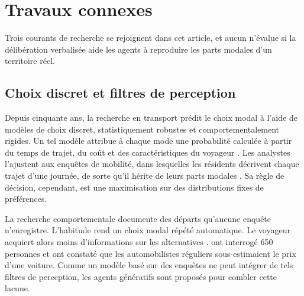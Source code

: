 
\section{Travaux connexes}
\label{sec:related}

Trois courants de recherche se rejoignent dans cet article, et aucun n'évalue si la délibération verbalisée aide les agents à reproduire les parts modales d'un territoire réel.

\subsection{Choix discret et filtres de perception}
\label{sec:discrete-choice}

Depuis cinquante ans, la recherche en transport prédit le choix modal à l'aide de modèles de choix discret, statistiquement robustes et comportementalement rigides. Un tel modèle attribue à chaque mode une probabilité calculée à partir du temps de trajet, du coût et des caractéristiques du voyageur \citep{mcfadden1974conditional,benakiva1985discrete}. Les analystes l'ajustent aux enquêtes de mobilité, dans lesquelles les résidents décrivent chaque trajet d'une journée, de sorte qu'il hérite de leurs parts modales \citep{train2009discrete}. Sa règle de décision, cependant, est une maximisation sur des distributions fixes de préférences.

La recherche comportementale documente des départs qu'aucune enquête n'enregistre. L'habitude rend un choix modal répété automatique. Le voyageur acquiert alors moins d'informations sur les alternatives \citep{verplanken1997habit,garling2003habitual}. \citet{adam2025survey} ont interrogé 650 personnes et ont constaté que les automobilistes réguliers sous-estimaient le prix d'une voiture. Comme un modèle basé sur des enquêtes ne peut intégrer de tels filtres de perception, les agents génératifs sont proposés pour combler cette lacune.


